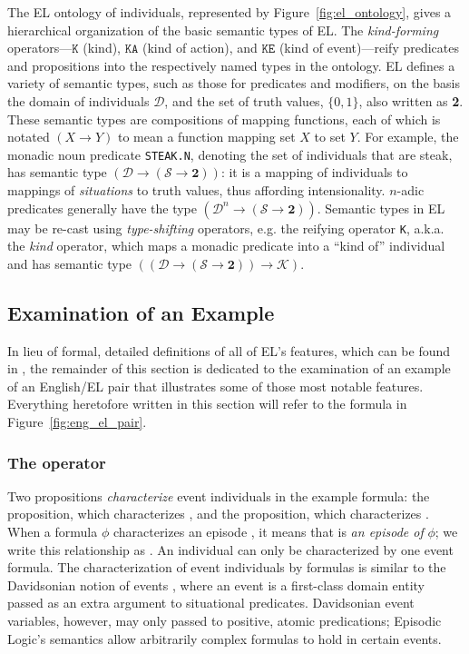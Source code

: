 The EL ontology of individuals, represented by Figure~\ref{fig:el_ontology}, gives a hierarchical organization of the basic semantic types of EL. The \textit{kind-forming} operators---$\texttt{K}$ (kind), $\texttt{KA}$ (kind of action), and $\texttt{KE}$ (kind of event)---reify predicates and propositions into the respectively named types in the ontology. EL defines a variety of semantic types, such as those for predicates and modifiers, on the basis the domain of individuals $\mathcal{D}$, and the set of truth values, $\{0,1\}$, also written as \textbf{2}. These semantic types are compositions of mapping functions, each of which is notated $(X \rightarrow Y)$ to mean a function mapping set $X$ to set $Y$. For example, the monadic noun predicate \texttt{STEAK.N}, denoting the set of individuals that are steak, has semantic type $(\mathcal{D} \rightarrow (\mathcal{S} \rightarrow \textbf{2}))$: it is a mapping of individuals to mappings of \textit{situations} to truth values, thus affording intensionality. $n$-adic predicates generally have the type $(\mathcal{D}^{n} \rightarrow (\mathcal{S} \rightarrow \textbf{2}))$. Semantic types in EL may be re-cast using \textit{type-shifting} operators, e.g. the reifying operator \texttt{K}, a.k.a. the \textit{kind} operator, which maps a monadic predicate into a ``kind of'' individual and has semantic type $((\mathcal{D} \rightarrow (\mathcal{S} \rightarrow \textbf{2})) \rightarrow \mathcal{K})$.

\subsection{Examination of an Example}
In lieu of formal, detailed definitions of all of EL's features, which can be found in \citep{schubert2000episodic}, the remainder of this section is dedicated to the examination of an example of an English/EL pair that illustrates some of those most notable features. Everything heretofore written in this section will refer to the formula in Figure~\ref{fig:eng_el_pair}.

\subsubsection{The \el{**} operator}
Two propositions \textit{characterize} event individuals in the example formula: the  proposition, which characterizes , and the  proposition, which characterizes . When a formula $\phi$ characterizes an episode , it means that  is \textit{an episode of} $\phi$; we write this relationship as . An individual can only be characterized by one event formula. The characterization of event individuals by formulas is similar to the Davidsonian notion of events \citep{Davidson1967}, where an event is a first-class domain entity passed as an extra argument to situational predicates. Davidsonian event variables, however, may only passed to positive, atomic predications; Episodic Logic's semantics allow arbitrarily complex formulas to hold in certain events.

